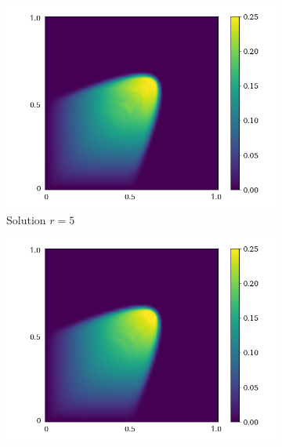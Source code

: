 \begin{figure}[ht!]
     \begin{center}
        \begin{subfigure}[b]{0.20\textwidth}
       \begin{center}
        \includegraphics[trim = {0, 0, 3cm, 0}, clip, width=\textwidth]{Pictures/X-rom-NE-DAE-5.png}
       \end{center}
            \caption{Solution $r = 5$}
        \end{subfigure}
   \begin{subfigure}[b]{0.20\textwidth}
        \begin{center}
            \includegraphics[trim = {0, 0, 3cm, 0}, clip, width=\textwidth]{Pictures/X-rom-NE-DAE-10.png}

\end{center}
\end{subfigure}
\end{center}
\end{figure}
